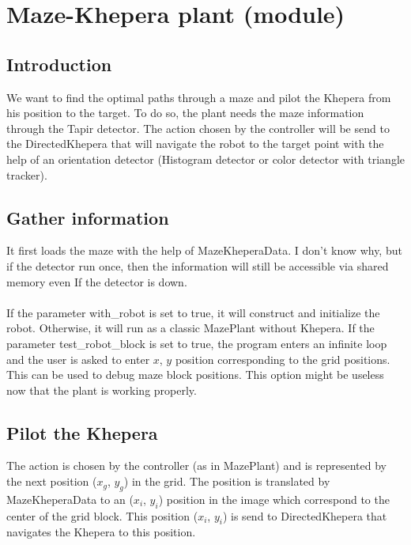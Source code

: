 \section{Maze-Khepera plant (module)}
\label{sec:mkp}

\subsection{Introduction}
\label{sec:mkp:intro}

We want to find the optimal paths through a maze and pilot the Khepera 
from his position to the target. To do so, the plant needs the maze 
information through the Tapir detector. The action chosen by the 
controller will be send to the DirectedKhepera that will navigate the 
robot
to the target point with the help of an orientation detector 
(Histogram detector or color detector with triangle tracker).

\subsection{Gather information}
\label{sec:mkp:gather}

It first loads the maze with the help of MazeKheperaData. I don't know 
why, but if the detector run once, then the information will still 
be accessible via shared memory even If the detector is down. 
\\
\\
If the parameter with\_robot is set to true, it will construct and 
initialize the robot. Otherwise, it will run as a classic MazePlant 
without Khepera.
If the parameter test\_robot\_block is set to true, the program enters an 
infinite loop and the user is asked to enter $x$, $y$ position 
corresponding 
to the grid positions. This can be used to debug maze block positions. 
This option might be useless now that the plant is working properly.

\subsection{Pilot the Khepera}
\label{sec:mkp:pilot}

The action is chosen by the controller (as in MazePlant) and 
is represented by the next position ($x_g$, $y_g$) in the grid. 
The position is translated by MazeKheperaData to an ($x_i$, $y_i$) position 
in the image which correspond to the center of the grid block. This 
position ($x_i$, $y_i$) is send to DirectedKhepera that navigates the 
Khepera to this position.

